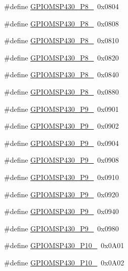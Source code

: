 \begin{DoxyCompactItemize}
\#define \hyperlink{_g_p_i_o_m_s_p430_8h_aa341187bded500777e9daf18d599530c}{G\+P\+I\+O\+M\+S\+P430\+\_\+\+P8\+\_}~0x0804
\item 
\#define \hyperlink{_g_p_i_o_m_s_p430_8h_a7f9a3196f91fb2193044af2fa51d302a}{G\+P\+I\+O\+M\+S\+P430\+\_\+\+P8\+\_}~0x0808
\item 
\#define \hyperlink{_g_p_i_o_m_s_p430_8h_a5ccda1a3d2437e17a37e271f6060e6ff}{G\+P\+I\+O\+M\+S\+P430\+\_\+\+P8\+\_}~0x0810
\item 
\#define \hyperlink{_g_p_i_o_m_s_p430_8h_ac61440cf027ac63f7e42acd3173e42b6}{G\+P\+I\+O\+M\+S\+P430\+\_\+\+P8\+\_}~0x0820
\item 
\#define \hyperlink{_g_p_i_o_m_s_p430_8h_a706c50558b3caa63a80a8b0d2e7bc0a0}{G\+P\+I\+O\+M\+S\+P430\+\_\+\+P8\+\_}~0x0840
\item 
\#define \hyperlink{_g_p_i_o_m_s_p430_8h_aa2b735d73f3014a9fc8340278b66ec2f}{G\+P\+I\+O\+M\+S\+P430\+\_\+\+P8\+\_}~0x0880
\item 
\#define \hyperlink{_g_p_i_o_m_s_p430_8h_a4a76773290800efbe38c03140bf1b1ec}{G\+P\+I\+O\+M\+S\+P430\+\_\+\+P9\+\_}~0x0901
\item 
\#define \hyperlink{_g_p_i_o_m_s_p430_8h_aa493ea7addd08beeab9318da7bf7d389}{G\+P\+I\+O\+M\+S\+P430\+\_\+\+P9\+\_}~0x0902
\item 
\#define \hyperlink{_g_p_i_o_m_s_p430_8h_aba29bbd8b969f82dcdb7e568f3f2170f}{G\+P\+I\+O\+M\+S\+P430\+\_\+\+P9\+\_}~0x0904
\item 
\#define \hyperlink{_g_p_i_o_m_s_p430_8h_a88c88cc4ba3dd176cdfe524484503b8f}{G\+P\+I\+O\+M\+S\+P430\+\_\+\+P9\+\_}~0x0908
\item 
\#define \hyperlink{_g_p_i_o_m_s_p430_8h_a2a47334a036d9cfd6a66e1ac4daf6820}{G\+P\+I\+O\+M\+S\+P430\+\_\+\+P9\+\_}~0x0910
\item 
\#define \hyperlink{_g_p_i_o_m_s_p430_8h_a6f6dadf259c42c057e5b1432d6b9e73d}{G\+P\+I\+O\+M\+S\+P430\+\_\+\+P9\+\_}~0x0920
\item 
\#define \hyperlink{_g_p_i_o_m_s_p430_8h_aa68a029bec1eb790aaab0acc4cd9a0fa}{G\+P\+I\+O\+M\+S\+P430\+\_\+\+P9\+\_}~0x0940
\item 
\#define \hyperlink{_g_p_i_o_m_s_p430_8h_a40c2ce40f422a2a54c72b467c5474f95}{G\+P\+I\+O\+M\+S\+P430\+\_\+\+P9\+\_}~0x0980
\item 
\#define \hyperlink{_g_p_i_o_m_s_p430_8h_a5ae6eb65f0ed0af2b66e5f14f37dcc7a}{G\+P\+I\+O\+M\+S\+P430\+\_\+\+P10\+\_}~0x0\+A01
\item 
\#define \hyperlink{_g_p_i_o_m_s_p430_8h_ae4da77f0780bb8db9e77d0deba311d6b}{G\+P\+I\+O\+M\+S\+P430\+\_\+\+P10\+\_}~0x0\+A02

\end{DoxyCompactItemize}
